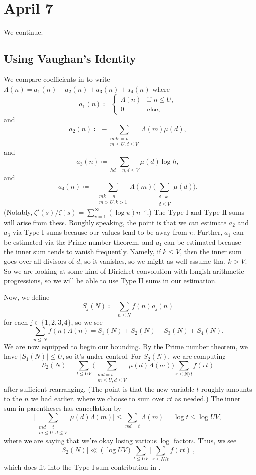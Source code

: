 \documentclass[../notes.tex]{subfiles}
\begin{document}
\section{April 7}

We continue.

\subsection{Using Vaughan's Identity}
We compare coefficients in  to write $\Lambda(n)=a_1(n)+a_2(n)+a_3(n)+a_4(n)$ where
\[a_1(n)\coloneqq\begin{cases}
	\Lambda(n) & \text{if }n\le U, \\
	0 & \text{else},
\end{cases}\]
and
\[a_2(n)\coloneqq-\sum_{\substack{mdr=n\\m\le U,d\le V}}\Lambda(m)\mu(d),\]
and
\[a_3(n)\coloneqq\sum_{hd=n,d\le V}\mu(d)\log h,\]
and
\[a_4(n)\coloneqq-\sum_{\substack{mk=n\\m>U,k>1}}\Lambda(m)\Bigg(\sum_{\substack{d\mid k\\d\le V}}\mu(d)\Bigg).\]
(Notably, $\zeta'(s)/\zeta(s)=\sum_{n=1}^\infty(\log n)n^{-s}$.) The Type I and Type II sums will arise from these. Roughly speaking, the point is that we can estimate $a_2$ and $a_3$ via Type I sums because our values tend to be away from $n$. Further, $a_1$ can be estimated via the Prime number theorem, and $a_4$ can be estimated because the inner sum tends to vanish frequently. Namely, if $k\le V$, then the inner sum goes over all divisors of $d$, so it vanishes, so we might as well assume that $k>V$. So we are looking at some kind of Dirichlet convolution with longish arithmetic progressions, so we will be able to use Type II sums in our estimation.

Now, we define
\[S_j(N)\coloneqq\sum_{n\le N}f(n)a_j(n)\]
for each $j\in\{1,2,3,4\}$, so we see
\[\sum_{n\le N}f(n)\Lambda(n)=S_1(N)+S_2(N)+S_3(N)+S_4(N).\]
We are now equipped to begin our bounding. By the Prime number theorem, we have $|S_1(N)|\le U$, so it's under control. For $S_2(N)$, we are computing
\[S_2(N)=\sum_{t\le UV}\Bigg(\sum_{\substack{md=t\\m\le U,d\le V}}\mu(d)\Lambda(m)\Bigg)\sum_{r\le N/t}f(rt)\]
after sufficient rearranging. (The point is that the new variable $t$ roughly amounts to the $n$ we had earlier, where we choose to sum over $rt$ as needed.) The inner sum in parentheses has cancellation by
\[\Bigg|\sum_{\substack{md=t\\m\le U,d\le V}}\mu(d)\Lambda(m)\Bigg|\le\sum_{md=t}\Lambda(m)=\log t\le\log UV,\]
where we are saying that we're okay losing various $\log$ factors. Thus, we see
\[|S_2(N)|\ll(\log UV)\sum_{t\le UV}\Bigg|\sum_{r\le N/t}f(rt)\Bigg|,\]
which does fit into the Type I sum contribution in .
\end{document}
